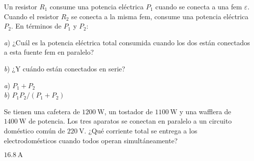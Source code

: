 %
\begin{Exercise}
  Un resistor $R_1$ consume una potencia eléctrica $P_1$ cuando se conecta a una fem $\varepsilon$. Cuando el resistor $R_2$ se conecta a la misma fem, consume una potencia eléctrica $P_2$. En términos de $P_1$ y $P_2$:\par
  \textit{a}) ¿Cuál es la potencia eléctrica total consumida cuando los dos están conectados a esta fuente fem en paralelo?\par
  \textit{b}) ¿Y cuándo están conectados en serie?
\end{Exercise}
\begin{Answer}
	\begin{minipage}[t]{.4\textwidth}
    \textit{a}) $P_1+P_2$\\ \textit{b}) $P_1P_2/(P_1+P_2)$
  \end{minipage}
\end{Answer}
%
\begin{Exercise}
  Se tienen una cafetera de $\SI{1200}{\watt}$, un tostador de $\SI{1100}{\watt}$ y una wafflera de $\SI{1400}{\watt}$ de potencia. Los tres aparatos se conectan en paralelo a un circuito doméstico común de $\SI{220}{\volt}$. ¿Qué corriente total se entrega a los electrodomésticos cuando todos operan simultáneamente?
\end{Exercise}
\begin{Answer}
	\begin{minipage}[t]{.4\textwidth}
    $\SI{16.8}{\ampere}$
  \end{minipage}
\end{Answer}
%
